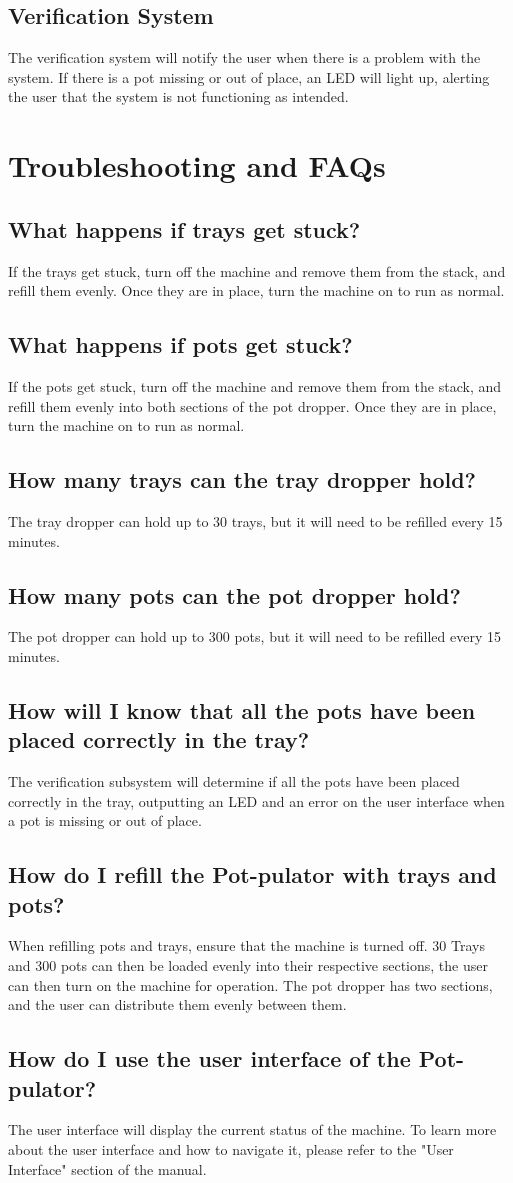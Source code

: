 \documentclass[12pt, titlepage]{article}
\begin{document}
\subsection{Verification System}
The verification system will notify the user when there is a problem with the system. If there is a pot missing or out of place, an LED will light up, alerting the user that the system is not functioning as intended. 
\section{Troubleshooting and FAQs}
\subsection{What happens if trays get stuck?}
If the trays get stuck, turn off the machine and remove them from the stack, and refill them evenly. Once they are in place, turn the machine on to run as normal.
\subsection{What happens if pots get stuck?}
If the pots get stuck, turn off the machine and remove them from the stack, and refill them evenly into both sections of the pot dropper. Once they are in place, turn the machine on to run as normal.
\subsection{How many trays can the tray dropper hold?}
The tray dropper can hold up to 30 trays, but it will need to be refilled every 15 minutes.
\subsection{How many pots can the pot dropper hold?}
The pot dropper can hold up to 300 pots, but it will need to be refilled every 15 minutes.
\subsection{How will I know that all the pots have been placed correctly in the tray?}
The verification subsystem will determine if all the pots have been placed correctly in the tray, outputting an LED and an error on the user interface when a pot is missing or out of place.
\subsection{How do I refill the Pot-pulator with trays and pots?}
When refilling pots and trays, ensure that the machine is turned off. 30 Trays and 300 pots can then be loaded evenly into their respective sections, the user can then turn on the machine for operation. The pot dropper has two sections, and the user can distribute them evenly between them.
\subsection{How do I use the user interface of the Pot-pulator?}
The user interface will display the current status of the machine. To learn more about the user interface and how to navigate it, please refer to the "User Interface" section of the manual.
\end{document}
